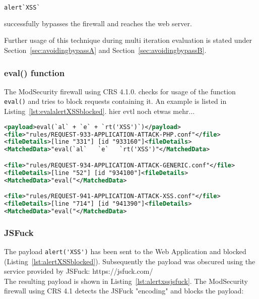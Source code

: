 \begin{lstlisting}[style=basicStyle, language=Python, caption=alert`XSS` bypass, label=lst:alertXSSbypass]
alert`XSS`
\end{lstlisting}

successfully bypasses the firewall and reaches the web server. 

Further usage of this technique during multi iteration evaluation is stated under Section~\ref{sec:avoidingbypassA} and Section~\ref{sec:avoidingbypassB}.


\subsubsection{eval() function}
The ModSecurity firewall using CRS 4.1.0. checks for usage of the function \verb|eval()| and tries to block requests containing it. An example is listed in Listing~\ref{lst:evalalertXSSblocked}.
{\color{red} hier evtl noch etwas mehr...}

\begin{lstlisting}[style=ruleStyle, language=XML, caption=eval(`al` + `e` + `rt('XSS')`) blocking example, label={lst:evalalertXSSblocked}]
<payload>eval(`al` + `e` + `rt('XSS')`)</payload>
<file>"rules/REQUEST-933-APPLICATION-ATTACK-PHP.conf"</file>
<fileDetails>[line "331"] [id "933160"]<fileDetails>
<MatchedData>"eval(`al`   `e`   `rt('XSS')"</MatchedData>

<file>"rules/REQUEST-934-APPLICATION-ATTACK-GENERIC.conf"</file>
<fileDetails>[line "52"] [id "934100"]<fileDetails>
<MatchedData>"eval("</MatchedData>

<file>"rules/REQUEST-941-APPLICATION-ATTACK-XSS.conf"</file>
<fileDetails>[line "714"] [id "941390"]<fileDetails>
<MatchedData>"eval("</MatchedData>
\end{lstlisting}

\subsubsection{JSFuck}
The payload \verb|alert('XSS')| has been sent to the Web Application and blocked (Listing~\ref{lst:alertXSSblocked}). Subsequently the payload was obscured using the service provided by JSFuck: https://jsfuck.com/ \\
The resulting payload is shown in Listing~\ref{lst:alertxssjsfuck}. The ModSecurity firewall using CRS 4.1 detects the JSFuck "encoding" and blocks the payload:

